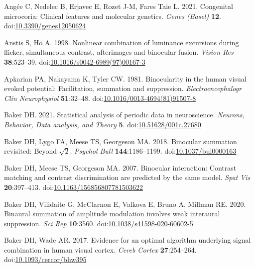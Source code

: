 \documentclass[
]{article}
\newlength{\cslhangindent}
\newlength{\cslentryspacingunit} %
\newenvironment{CSLReferences}[2] %
 {%
  \setlength{\parindent}{0pt}
  \ifodd #1
  \let\oldpar\par
  \def\par{\hangindent=\cslhangindent\oldpar}
  \fi
  \setlength{\parskip}{#2\cslentryspacingunit}
 }%
 {}
\begin{document}
\hypertarget{refs}{}
\begin{CSLReferences}{1}{0}
\leavevmode{}%
Angée C, Nedelec B, Erjavec E, Rozet J-M, Fares Taie L. 2021. Congenital microcoria: Clinical features and molecular genetics. \emph{Genes (Basel)} \textbf{12}. doi:\href{https://doi.org/10.3390/genes12050624}{10.3390/genes12050624}

\leavevmode{}%
Anstis S, Ho A. 1998. Nonlinear combination of luminance excursions during flicker, simultaneous contrast, afterimages and binocular fusion. \emph{Vision Res} \textbf{38}:523--39. doi:\href{https://doi.org/10.1016/s0042-6989(97)00167-3}{10.1016/s0042-6989(97)00167-3}

\leavevmode{}%
Apkarian PA, Nakayama K, Tyler CW. 1981. Binocularity in the human visual evoked potential: Facilitation, summation and suppression. \emph{Electroencephalogr Clin Neurophysiol} \textbf{51}:32--48. doi:\href{https://doi.org/10.1016/0013-4694(81)91507-8}{10.1016/0013-4694(81)91507-8}

\leavevmode{}%
Baker DH. 2021. Statistical analysis of periodic data in neuroscience. \emph{Neurons, Behavior, Data analysis, and Theory} \textbf{5}. doi:\href{https://doi.org/10.51628/001c.27680}{10.51628/001c.27680}

\leavevmode{}%
Baker DH, Lygo FA, Meese TS, Georgeson MA. 2018. Binocular summation revisited: Beyond \(\sqrt{2}\). \emph{Psychol Bull} \textbf{144}:1186--1199. doi:\href{https://doi.org/10.1037/bul0000163}{10.1037/bul0000163}

\leavevmode{}%
Baker DH, Meese TS, Georgeson MA. 2007. Binocular interaction: Contrast matching and contrast discrimination are predicted by the same model. \emph{Spat Vis} \textbf{20}:397--413. doi:\href{https://doi.org/10.1163/156856807781503622}{10.1163/156856807781503622}

\leavevmode{}%
Baker DH, Vilidaite G, McClarnon E, Valkova E, Bruno A, Millman RE. 2020. Binaural summation of amplitude modulation involves weak interaural suppression. \emph{Sci Rep} \textbf{10}:3560. doi:\href{https://doi.org/10.1038/s41598-020-60602-5}{10.1038/s41598-020-60602-5}

\leavevmode{}%
Baker DH, Wade AR. 2017. Evidence for an optimal algorithm underlying signal combination in human visual cortex. \emph{Cereb Cortex} \textbf{27}:254--264. doi:\href{https://doi.org/10.1093/cercor/bhw395}{10.1093/cercor/bhw395}


\end{CSLReferences}
\end{document}
